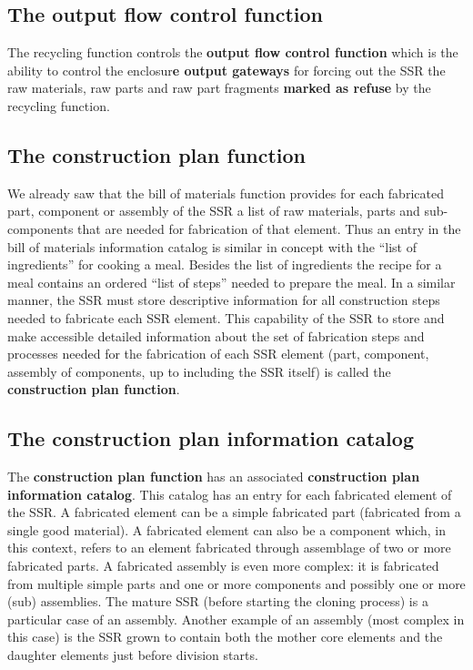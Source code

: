 \bigskip

\subsection[The output flow control function]{The output flow control
function}
\hypertarget{RefHeading3082306210128}{}The recycling function controls
the \textbf{output flow control function }which is the ability to
control the enclosur\textbf{e output gateways }for forcing out the SSR
the raw materials, raw parts and raw part fragments \textbf{marked as
refuse} by the recycling function.


\bigskip

\subsection[The construction plan function]{The construction plan
function}
\hypertarget{RefHeading3084306210128}{}We already saw that the bill of
materials function provides for each fabricated part, component or
assembly of the SSR a list of raw materials, parts and sub-components
that are needed for fabrication of that element. Thus an entry in the
bill of materials information catalog is similar in concept with the
“list of ingredients” for cooking a meal. Besides the list of
ingredients the recipe for a meal contains an ordered “list of steps”
needed to prepare the meal. In a similar manner, the SSR must store
descriptive information for all construction steps needed to fabricate
each SSR element. This capability of the SSR to store and make
accessible detailed information about the set of fabrication steps and
processes needed for the fabrication of each SSR element (part,
component, assembly of components, up to including the SSR itself) is
called the \textbf{construction plan function}.


\bigskip

\subsection[The construction plan information catalog]{The construction
plan information catalog}
\hypertarget{RefHeading3086306210128}{}The \textbf{construction plan
function} has an associated \textbf{construction plan information
catalog}. This catalog has an entry for each fabricated element of the
SSR. A fabricated element can be a simple fabricated part (fabricated
from a single good material). A fabricated element can also be a
component which, in this context, refers to an element fabricated
through assemblage of two or more fabricated parts. A fabricated
assembly is even more complex: it is fabricated from multiple simple
parts and one or more components and possibly one or more (sub)
assemblies. The mature SSR (before starting the cloning process) is a
particular case of an assembly. Another example of an assembly (most
complex in this case) is the SSR grown to contain both the mother core
elements and the daughter elements just before division starts. 


